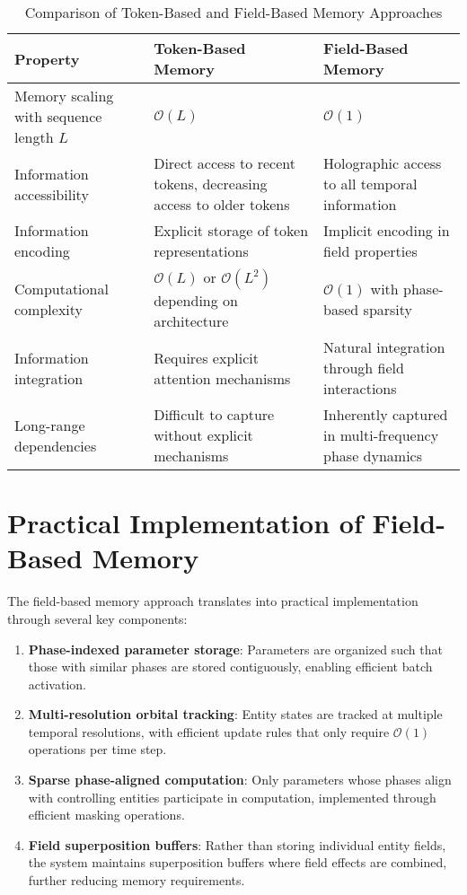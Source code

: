 \begin{table}[h]
\centering
\begin{tabular}{|p{4cm}|p{5cm}|p{5cm}|}
\hline
\textbf{Property} & \textbf{Token-Based Memory} & \textbf{Field-Based Memory} \\
\hline
Memory scaling with sequence length $L$ & $\mathcal{O}(L)$ & $\mathcal{O}(1)$ \\
\hline
Information accessibility & Direct access to recent tokens, decreasing access to older tokens & Holographic access to all temporal information \\
\hline
Information encoding & Explicit storage of token representations & Implicit encoding in field properties \\
\hline
Computational complexity & $\mathcal{O}(L)$ or $\mathcal{O}(L^2)$ depending on architecture & $\mathcal{O}(1)$ with phase-based sparsity \\
\hline
Information integration & Requires explicit attention mechanisms & Natural integration through field interactions \\
\hline
Long-range dependencies & Difficult to capture without explicit mechanisms & Inherently captured in multi-frequency phase dynamics \\
\hline
\end{tabular}
\caption{Comparison of Token-Based and Field-Based Memory Approaches}
\end{table}

\section{Practical Implementation of Field-Based Memory}

The field-based memory approach translates into practical implementation through several key components:

\begin{enumerate}
    \item \textbf{Phase-indexed parameter storage}: Parameters are organized such that those with similar phases are stored contiguously, enabling efficient batch activation.
    
    \item \textbf{Multi-resolution orbital tracking}: Entity states are tracked at multiple temporal resolutions, with efficient update rules that only require $\mathcal{O}(1)$ operations per time step.
    
    \item \textbf{Sparse phase-aligned computation}: Only parameters whose phases align with controlling entities participate in computation, implemented through efficient masking operations.
    
    \item \textbf{Field superposition buffers}: Rather than storing individual entity fields, the system maintains superposition buffers where field effects are combined, further reducing memory requirements.
\end{enumerate}

